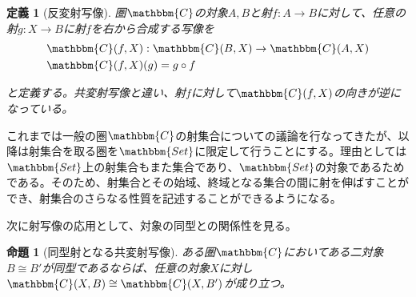 \documentclass[uplatex,dvipdfmx]{jsarticle}
\newcommand{\cat}[1]{\mathbbm{#1}}
\newcommand{\arrow}{\rightarrow}
\newcommand{\mor}[3]{#1:#2\arrow #3}
\newcommand{\arset}[3]{\cat{#1}(#2,#3)}
\newtheorem{prop}{命題}[section]
\newtheorem{define}{定義}[section]
\numberwithin{proof}{subsection}
\numberwithin{prop}{subsection}
\numberwithin{define}{subsection}
\begin{document}
	\begin{define}[反変射写像]
		圏$\cat{C}$の対象$A,B$と射$\mor{f}{A}{B}$に対して、任意の射$\mor{g}{X}{B}$に射$f$を右から合成する写像を
		\begin{align*}
			&\mor{\arset{C}{f}{X}}{\arset{C}{B}{X}}{\arset{C}{A}{X}}\\
			&\arset{C}{f}{X}(g)=g\circ f
		\end{align*}
		\begin{center}
		\end{center}
		と定義する。共変射写像と違い、射$f$に対して$\arset{C}{f}{X}$の向きが逆になっている。
	\end{define}

  これまでは一般の圏$\cat{C}$の射集合についての議論を行なってきたが、以降は射集合を取る圏を$\cat{Set}$に限定して行うことにする。理由としては$\cat{Set}$上の射集合もまた集合であり、$\cat{Set}$の対象であるためである。そのため、射集合とその始域、終域となる集合の間に射を伸ばすことができ、射集合のさらなる性質を記述することができるようになる。

  次に射写像の応用として、対象の同型との関係性を見る。

  \begin{prop}[同型射となる共変射写像]
    ある圏$\cat{C}$においてある二対象$B\cong B'$が同型であるならば、任意の対象$X$に対し$\arset{C}{X}{B}\cong\arset{C}{X}{B'}$が成り立つ。
  \end{prop}
\end{document}
